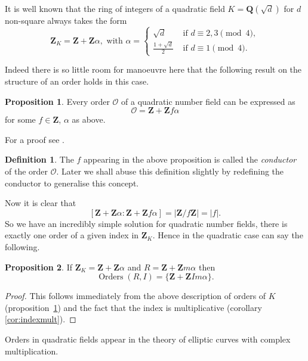 \documentclass[a4paper,abstracton,bibtotoc]{scrreprt}
\theoremstyle{definition}
\newtheorem{prop}{Proposition}
\newtheorem{defn}{Definition}
\newcommand{\QQ}{\mathbf{Q}}
\newcommand{\ZZ}{\mathbf{Z}}
\renewcommand{\O}{\mathcal{O}}
\DeclareMathOperator{\Orders}{Orders}
\begin{document}
It is well known \cite{lang} that the ring of integers of a quadratic field $K = \QQ(\sqrt{d})$ for $d$ non-square always takes the form
\[\ZZ_K = \ZZ + \ZZ\alpha,\text{ with } \alpha =\begin{cases}
\sqrt{d}&\text{ if $d\equiv 2,3\pmod{4}$},\\
\frac{1+\sqrt{d}}{2}&\text{ if $d\equiv 1\pmod{4}$}.
\end{cases}\]

Indeed there is so little room for manoeuvre here that the following result on the structure of an order holds in this case.

\begin{prop}
\label{prop:quadord}
Every order $\O$ of a quadratic number field can be expressed as
\[\O = \ZZ + \ZZ f\alpha\]
for some $f\in \ZZ$, $\alpha$ as above.
\end{prop}

For a proof see \cite[pp. 133--134]{cox}.

\begin{defn}
The $f$ appearing in the above proposition is called the \emph{conductor} of the order $\O$.
Later we shall abuse this definition slightly by redefining the conductor to generalise this concept.
\end{defn}

Now it is clear that
\[
[\ZZ + \ZZ\alpha : \ZZ + \ZZ f \alpha] = |\ZZ/f\ZZ| = |f|.
\]
So we have an incredibly simple solution for quadratic number fields, there is exactly one order of a given index in $\ZZ_K$.
Hence in the quadratic case can say the following.

\begin{prop}
If $\ZZ_K = \ZZ + \ZZ\alpha$ and $R = \ZZ + \ZZ m\alpha$ then
\[
\Orders(R, I) = \{\ZZ + \ZZ Im\alpha\}.
\]
\end{prop}
\begin{proof}
This follows immediately from the above description of orders of $K$ (proposition~\ref{prop:quadord}) and the fact that the index is multiplicative (corollary \ref{cor:indexmult}).
\end{proof}

Orders in quadratic fields appear in the theory of elliptic curves with complex multiplication. %
\end{document}
